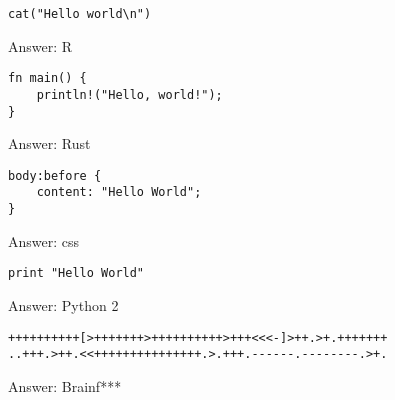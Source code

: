 \documentclass{article}
\begin{document}
\begin{multicols}{2}


\begin{verbatim}
cat("Hello world\n")
\end{verbatim}

\columnbreak

\begin{flushright}
    Answer: R
\end{flushright}

\end{multicols}


\hrulefill
\begin{multicols}{2}


\begin{verbatim}
fn main() {
    println!("Hello, world!");
}
\end{verbatim}

\columnbreak

\begin{flushright}
    Answer: Rust
\end{flushright}

\end{multicols}

\hrulefill
\begin{multicols}{2}


\begin{verbatim}
body:before {
    content: "Hello World";
}
\end{verbatim}

\columnbreak

\begin{flushright}
    Answer: css
\end{flushright}

\end{multicols}

\hrulefill
\begin{multicols}{2}


\begin{verbatim}
print "Hello World"
\end{verbatim}

\columnbreak

\begin{flushright}
    Answer: Python 2
\end{flushright}

\end{multicols}

\hrulefill
\begin{multicols}{2}


\begin{verbatim}
++++++++++[>+++++++>++++++++++>+++<<<-]>++.>+.+++++++
..+++.>++.<<+++++++++++++++.>.+++.------.--------.>+.
\end{verbatim}

\columnbreak

\begin{flushright}
    Answer: Brainf***
\end{flushright}

\end{multicols}
\end{document}
